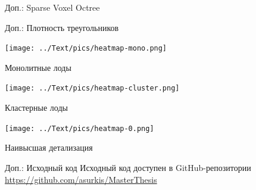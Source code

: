 \begin{frame}{Доп.: Sparse Voxel Octree}
\begin{minipage}{.2\textwidth}
    \end{minipage}
\end{frame}

\begin{frame}{Доп.: Плотность треугольников}
    \begin{center}
        \begin{minipage}{.45\textwidth}
            \begin{center}
                \texttt{[image: ../Text/pics/heatmap-mono.png]}

                Монолитные лоды
            \end{center}
        \end{minipage}
        \begin{minipage}{.45\textwidth}
            \begin{center}
                \texttt{[image: ../Text/pics/heatmap-cluster.png]}

                Кластерные лоды
            \end{center}
        \end{minipage}
        \begin{minipage}{.45\textwidth}
            \begin{center}
                \texttt{[image: ../Text/pics/heatmap-0.png]}

                Наивысшая детализация
            \end{center}
        \end{minipage}
    \end{center}
\end{frame}

\begin{frame}{Доп.: Исходный код}
    Исходный код доступен в GitHub-репозитории\\
    \url{https://github.com/asurkis/MasterThesis}

    \bigskip

    \begin{center}
    \end{center}
\end{frame}
